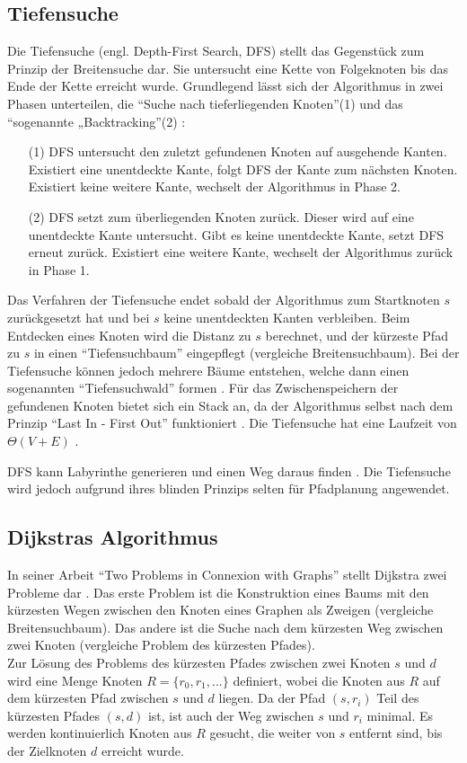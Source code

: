 \subsection{Tiefensuche}
\label{sec:dfs}
Die Tiefensuche (engl. Depth-First Search, DFS) stellt das Gegenstück zum Prinzip der Breitensuche dar. Sie untersucht eine Kette von Folgeknoten bis das Ende der Kette erreicht wurde. Grundlegend lässt sich der Algorithmus in zwei Phasen unterteilen, die ``Suche nach tieferliegenden Knoten''(1) und das ``sogenannte „Backtracking''(2) \cite{Tarjan.1972}:
\begin{itemize}
	\item[(1)] DFS untersucht den zuletzt gefundenen Knoten auf ausgehende Kanten. Existiert eine unentdeckte Kante, folgt DFS der Kante zum nächsten Knoten. Existiert keine weitere Kante, wechselt der Algorithmus in Phase 2.
	\item[(2)] DFS setzt zum überliegenden Knoten zurück. Dieser wird auf eine unentdeckte Kante untersucht. Gibt es keine unentdeckte Kante, setzt DFS erneut zurück. Existiert eine weitere Kante, wechselt der Algorithmus zurück in Phase 1.	
\end{itemize}
Das Verfahren der Tiefensuche endet sobald der Algorithmus zum Startknoten $s$ zurückgesetzt hat und bei $s$ keine unentdeckten Kanten verbleiben. Beim Entdecken eines Knoten wird die Distanz zu $s$ berechnet, und der kürzeste Pfad zu $s$ in einen ``Tiefensuchbaum'' eingepflegt (vergleiche Breitensuchbaum). Bei der Tiefensuche können jedoch mehrere Bäume entstehen, welche dann einen sogenannten ``Tiefensuchwald'' formen \cite[S.603]{Cormen.2009}.
Für das Zwischenspeichern der gefundenen Knoten bietet sich ein Stack an, da der Algorithmus selbst nach dem Prinzip ``Last In - First Out'' funktioniert \cite{Tarjan.1972}. Die Tiefensuche hat eine Laufzeit von $\Theta(V + E)$ \cite[S.606]{Cormen.2009}.

DFS kann Labyrinthe generieren und einen Weg daraus finden \cite{KB15}. Die Tiefensuche wird jedoch aufgrund ihres blinden Prinzips selten für Pfadplanung angewendet.


\subsection{Dijkstras Algorithmus}
\label{sec:dijkstra}
In seiner Arbeit ``Two Problems in Connexion with Graphs'' stellt Dijkstra zwei Probleme dar \cite{Dijkstra.1959}. Das erste Problem ist die Konstruktion eines Baums mit den kürzesten Wegen zwischen den Knoten eines Graphen als Zweigen (vergleiche Breitensuchbaum). Das andere ist die Suche nach dem kürzesten Weg zwischen zwei Knoten (vergleiche Problem des kürzesten Pfades). \\
Zur Lösung des Problems des kürzesten Pfades zwischen zwei Knoten $s$ und $d$ wird eine Menge Knoten $R = \{r_0, r_1, ...\}$ definiert, wobei die Knoten aus $R$ auf dem kürzesten Pfad zwischen $s$ und $d$ liegen. Da der Pfad $\left(s,r_i\right)$ Teil des kürzesten Pfades $\left(s,d\right)$ ist, ist auch der Weg zwischen $s$ und $r_i$ minimal. Es werden kontinuierlich Knoten aus $R$ gesucht, die weiter von $s$ entfernt sind, bis der Zielknoten $d$ erreicht wurde.

